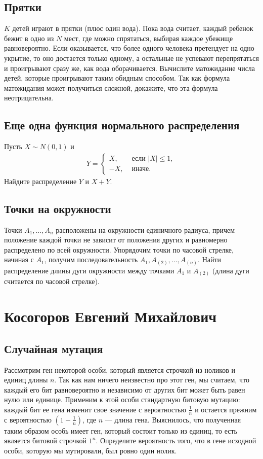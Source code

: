 \documentclass[12pt]{article}
\begin{document}
\subsection{Прятки}
$K$ детей играют в прятки (плюс один вода). Пока вода считает, каждый ребенок бежит в одно из $N$ мест, где можно спрятаться, выбирая каждое убежище равновероятно. Если оказывается, что более одного человека претендует на одно укрытие, то оно достается только одному, а остальные не успевают перепрятаться и проигрывают сразу же, как вода оборачивается. Вычислите матожидание числа детей, которые проигрывают таким обидным способом. Так как формула матожидания может получиться сложной, докажите, что эта формула неотрицательна.

\subsection{Еще одна функция нормального распределения}
Пусть $X \sim N(0, 1)$ и 
\begin{align*}
    Y = \begin{cases}
        X, &\text{ если } |X| \le 1, \\
        -X, &\text{ иначе.}
    \end{cases}
\end{align*}
Найдите распределение $Y$ и $X + Y$.

\subsection{Точки на окружности}
Точки $A_1, \dots, A_n$ расположены на окружности единичного радиуса, причем положение каждой точки не зависит от положения других и равномерно распределено по всей окружности. Упорядочим точки по часовой стрелке, начиная с $A_1$, получим последовательность $A_1, A_{(2)}, \dots, A_{(n)}$. Найти распределение длины дуги окружности между точками $A_1$ и $A_{(2)}$ (длина дуги считается по часовой стрелке).

\newpage
\section{Косогоров Евгений Михайлович}

\subsection{Случайная мутация}
Рассмотрим ген некоторой особи, который является строчкой из ноликов и единиц длины $n$. Так как нам ничего неизвестно про этот ген, мы считаем, что каждый его бит равновероятно и независимо от других бит может быть равен нулю или единице. Применим к этой особи стандартную битовую мутацию: каждый бит ее гена изменит свое значение с вероятностью $\frac{1}{n}$ и остается прежним с вероятностью $(1 - \frac{1}{n})$, где $n$ --- длина гена. Выяснилось, что полученная таким образом особь имеет ген, который состоит только из единиц, то есть является битовой строчкой $1^n$. Определите вероятность того, что в гене исходной особи, которую мы мутировали, был ровно один нолик.
\end{document}
